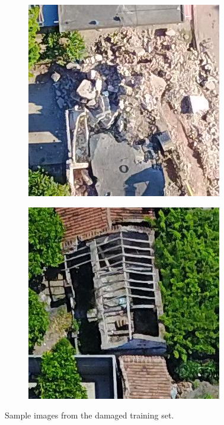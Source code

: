 \begin{figure}[!ht]
\begin{subfigure}{.24\textwidth}
    \end{subfigure}
    \begin{subfigure}{.24\textwidth}
        \includegraphics[width=\textwidth]{images/damaged7.jpg}
    \end{subfigure}
    \begin{subfigure}{.24\textwidth}
        \includegraphics[width=\textwidth]{images/damaged8.jpg}
    \end{subfigure}
  \caption{Sample images from the damaged training set.}
  \label{fig:damaged}
\end{figure}



